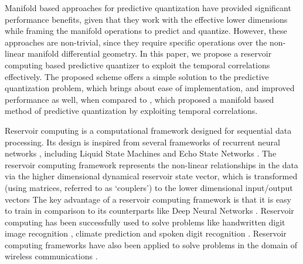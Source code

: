 \documentclass[conference]{IEEEtran}
\begin{document}
Manifold based approaches for predictive quantization have provided significant performance benefits, given that they work with the effective lower dimensions while framing the manifold operations to predict and quantize.
However, these approaches are non-trivial, since they require specific operations over the non-linear manifold differential geometry.
In this paper, we propose a reservoir computing based predictive quantizer to exploit the temporal correlations effectively.
The proposed scheme offers a simple solution to the predictive quantization problem, which brings about ease of implementation, and improved performance as well, when compared to \cite{6891198}, which proposed a manifold based method of predictive quantization by exploiting temporal correlations.

{
Reservoir computing is a computational framework designed for sequential data processing.
Its design is inspired from several frameworks of recurrent neural networks \cite{jaeger2004harnessing}, including Liquid State Machines \cite{jalalvand2015real} and Echo State Networks \cite{mosleh2017brain,pathak2017using}.
The reservoir computing framework represents the non-linear relationships in the data via the higher dimensional dynamical reservoir state vector, which is transformed (using
matrices, referred to as `couplers') to the lower dimensional input/output vectors
The key advantage of a reservoir computing framework is that it is easy to train in comparison to its counterparts like Deep Neural Networks \cite{mosleh2017brain}.
Reservoir computing has been successfully used to solve problems like handwritten digit image recognition \cite{jalalvand2015real}, climate prediction \cite{pathak2017using} and spoken digit recognition \cite{verstraeten2005isolated}.
}
Reservoir computing frameworks have also been applied to solve problems in the domain of wireless communications \cite{jaeger2004harnessing,mosleh2017brain,shafin2018realizing}.
\end{document}
